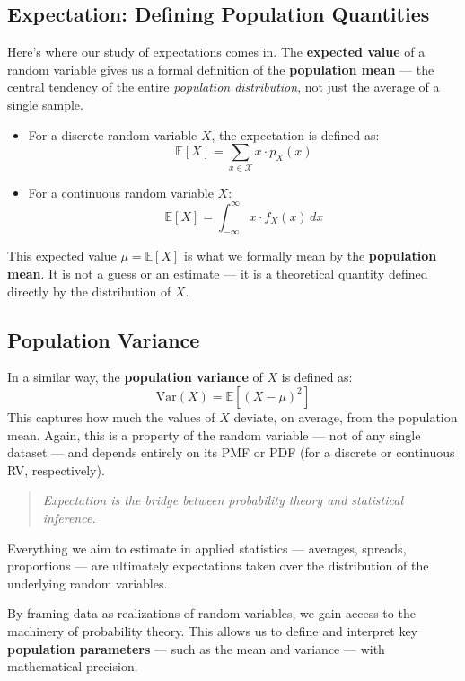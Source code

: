 \documentclass[12pt]{article}
\begin{document}
\subsection*{Expectation: Defining Population Quantities}

Here’s where our study of expectations comes in. The \textbf{expected value} of a random variable gives us a formal definition of the \textbf{population mean} — the central tendency of the entire \emph{population distribution}, not just the average of a single sample.

\begin{itemize}
    \item For a discrete random variable $X$, the expectation is defined as:
    \[
    \mathbb{E}[X] = \sum_{x \in \mathcal{X}} x \cdot p_X(x)
    \]
    \item For a continuous random variable $X$:
    \[
    \mathbb{E}[X] = \int_{-\infty}^{\infty} x \cdot f_X(x) \, dx
    \]
\end{itemize}

This expected value $\mu = \mathbb{E}[X]$ is what we formally mean by the \textbf{population mean}. It is not a guess or an estimate — it is a theoretical quantity defined directly by the distribution of $X$.

\subsection*{Population Variance}

In a similar way, the \textbf{population variance} of $X$ is defined as:
\[
\mathrm{Var}(X) = \mathbb{E}[(X - \mu)^2]
\]
This captures how much the values of $X$ deviate, on average, from the population mean. Again, this is a property of the random variable — not of any single dataset — and depends entirely on its PMF or PDF (for a discrete or continuous RV, respectively).

\begin{quote}
    \textit{Expectation is the bridge between probability theory and statistical inference.}
\end{quote}

Everything we aim to estimate in applied statistics — averages, spreads, proportions — are ultimately expectations taken over the distribution of the underlying random variables.

By framing data as realizations of random variables, we gain access to the machinery of probability theory. This allows us to define and interpret key \textbf{population parameters} — such as the mean and variance — with mathematical precision.
\end{document}
